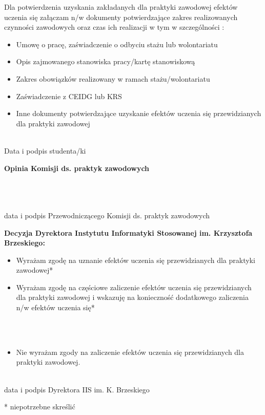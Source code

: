 \documentclass[11pt,a4paper]{article}
\begin{document}
\vspace{1em}

\noindent Dla potwierdzenia uzyskania zakładanych dla praktyki zawodowej efektów uczenia się załączam n/w dokumenty potwierdzające zakres realizowanych czynności zawodowych oraz czas ich realizacji w tym w szczególności :
\begin{itemize}
    \item[$\square$] Umowę o pracę, zaświadczenie o odbyciu stażu lub wolontariatu
    \item[$\square$] Opis zajmowanego stanowiska pracy/kartę stanowiskową
    \item[$\square$] Zakres obowiązków realizowany w ramach stażu/wolontariatu
    \item[$\square$] Zaświadczenie z CEIDG lub KRS
    \item[$\square$] Inne dokumenty potwierdzające uzyskanie efektów uczenia się przewidzianych dla praktyki zawodowej
\end{itemize}

\vspace{2em}
\noindent\hfill
\begin{minipage}[t]{0.45\textwidth}
\centering
\dotfill \\
\small Data i podpis studenta/ki
\end{minipage}
\newpage
\vspace{2em}
\noindent \textbf{Opinia Komisji ds. praktyk zawodowych} \\
\dotfill \\
\dotfill \\
\dotfill 

\vspace{2em}
\noindent\hfill
\begin{minipage}[t]{0.45\textwidth}
\centering
\dotfill \\
\small data i podpis Przewodniczącego Komisji ds. praktyk zawodowych 
\end{minipage}

\vspace{2em}
\noindent \textbf{Decyzja Dyrektora Instytutu Informatyki Stosowanej im. Krzysztofa Brzeskiego:}
\begin{itemize}
    \item[$\square$] Wyrażam zgodę na uznanie efektów uczenia się przewidzianych dla praktyki zawodowej*
    \item[$\square$] Wyrażam zgodę na częściowe zaliczenie efektów uczenia się przewidzianych dla praktyki zawodowej i wskazuję na konieczność dodatkowego zaliczenia n/w efektów uczenia się*
\end{itemize}
\vspace{-0.5em}
\dotfill \\
\dotfill \\
\dotfill 
\begin{itemize}
    \item[$\square$] Nie wyrażam zgody na zaliczenie efektów uczenia się przewidzianych dla praktyki zawodowej.
\end{itemize}

\vspace{2em}
\noindent\hfill
\begin{minipage}[t]{0.45\textwidth}
\centering
\dotfill \\
\small data i podpis Dyrektora IIS im. K. Brzeskiego
\end{minipage}

\vspace{1em}
\noindent \footnotesize{* niepotrzebne skreślić}
\end{document}
